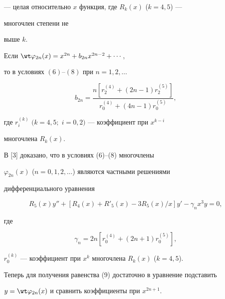 --- целая относительно $x$ функция, где $R_k(x)$ ($k=4,5$) --- 


многочлен степени не 


выше $k$. 


 


\begin{thm} 


Если $\wt\varphi_{2n}(x)=x^{2n}+b_{2n}x^{2n-2}+\dotsb$, 


то в условиях $(6)$--$(8)$ при $n=1,2,\dotsc$ 


\begin{equation} 


b_{2n}=\frac{n[r^{(4)}_2+(2n-1)r^{(5)}_2]} 


{r^{(4)}_0+(4n-1)r^{(5)}_0}, 


\end{equation} 


где $r^{(k)}_i$ $(k=4,5;$ $i=0,2)$ --- коэффициент при $x^{k-i}$ 


многочлена $R_k(x)$. 


\end{thm} 


 


\begin{pf} 


В [3] доказано, что в условиях (6)--(8) многочлены 


$\varphi_{2n}(x)$ ($n=0,1,2,\dotsc$) являются частными решениями 


дифференциального уравнения 


$$ 


R_5(x)y''+[R_4(x)+R'_5(x)-3R_5(x)/x]y'- 


\gamma_n x^3y=0, 


$$ 


где 


$$ 


\gamma_n=2n[r^{(4)}_0+(2n+1)r^{(5)}_0], 


$$ 


$r^{(k)}_0$ --- коэффициент при $x^k$ многочлена $R_k(x)$ ($k=4,5$). 


 


Теперь для получения равенства (9) достаточно в уравнение подставить 


$y=\wt\varphi_{2n}(x)$ и сравнить коэффициенты при $x^{2n+1}$. 


\end{pf} 


